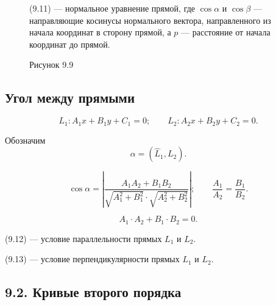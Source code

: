 \documentclass[12pt,a4paper]{article}
\newcommand{\vn}{\bar n}
\begin{document}
\begin{figure}[H]
  \centering
  \begin{minipage}{0.4\textwidth}
    \centering
    \caption*{Рисунок 9.9}
  \end{minipage}%
  \begin{minipage}{0.55\textwidth}
    (9.11) --- нормальное уравнение прямой, где $\cos\alpha$ и
    $\cos\beta$ --- направляющие косинусы нормального вектора,
    направленного из начала координат в сторону прямой, а $p$ ---
    расстояние от начала координат до прямой.
  \end{minipage}
\end{figure}

\subsection*{\textbf{Угол между прямыми}}

$$
L_1:A_1x+B_1y+C_1=0;
\qquad
L_2:A_2x+B_2y+C_2=0.
$$

Обозначим
$$
\alpha=(\hat L_1,L_2).
$$

\begin{equation}
  \cos\alpha=
  \left|
  \frac{A_1A_2+B_1B_2}
  {\sqrt{A_1^2+B_1^2}\cdot\sqrt{A_2^2+B_2^2}}
  \right|;
  \qquad
  \frac{A_1}{A_2}=\frac{B_1}{B_2}. \tag{9.12}
\end{equation}

\begin{equation}
  A_1\cdot A_2+B_1\cdot B_2=0. \tag{9.13}
\end{equation}

(9.12) --- условие параллельности прямых $L_1$ и $L_2$.

(9.13) --- условие перпендикулярности прямых $L_1$ и $L_2$.

\subsection*{9.2. Кривые второго порядка}
\end{document}
